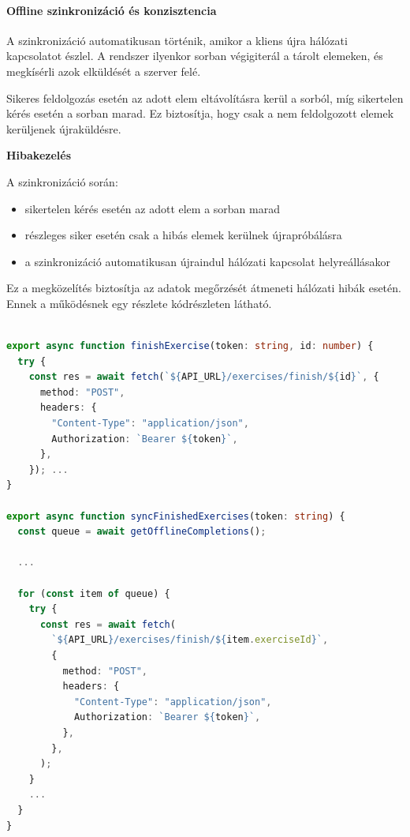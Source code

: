 \documentclass[
]{thesis-ekf}
\theoremstyle{definition}
\theoremstyle{remark}
\begin{document}
\paragraph{Offline szinkronizáció és konzisztencia}

A szinkronizáció automatikusan történik, amikor a kliens újra hálózati kapcsolatot észlel. A rendszer ilyenkor sorban végigiterál a tárolt elemeken, és megkísérli azok elküldését a szerver felé.

Sikeres feldolgozás esetén az adott elem eltávolításra kerül a sorból, míg sikertelen kérés esetén a sorban marad. Ez biztosítja, hogy csak a nem feldolgozott elemek kerüljenek újraküldésre.

\textbf{Hibakezelés}

A szinkronizáció során:
\begin{itemize}
    \item sikertelen kérés esetén az adott elem a sorban marad
    \item részleges siker esetén csak a hibás elemek kerülnek újrapróbálásra
    \item a szinkronizáció automatikusan újraindul hálózati kapcsolat helyreállásakor
\end{itemize}

Ez a megközelítés biztosítja az adatok megőrzését átmeneti hálózati hibák esetén.  Ennek a működésnek egy részlete  kódrészleten látható.

 \begin{lstlisting}[language=TypeScript, style=typescriptstyle, caption={Az edzések elmentése és szinkronizálása (részlet)}, label={code_exercise_sync}]
     
export async function finishExercise(token: string, id: number) {
  try {
    const res = await fetch(`${API_URL}/exercises/finish/${id}`, {
      method: "POST",
      headers: {
        "Content-Type": "application/json",
        Authorization: `Bearer ${token}`,
      },
    }); ...
}

export async function syncFinishedExercises(token: string) {
  const queue = await getOfflineCompletions();

  ...

  for (const item of queue) {
    try {
      const res = await fetch(
        `${API_URL}/exercises/finish/${item.exerciseId}`,
        {
          method: "POST",
          headers: {
            "Content-Type": "application/json",
            Authorization: `Bearer ${token}`,
          },
        },
      );
    }
    ...
  }
}
 \end{lstlisting}
\end{document}
